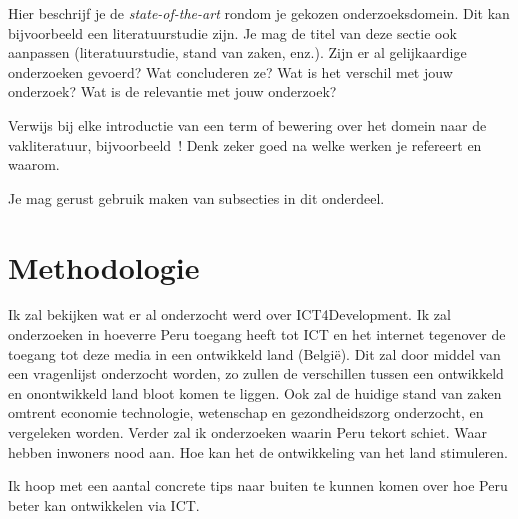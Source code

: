 
Hier beschrijf je de \emph{state-of-the-art} rondom je gekozen onderzoeksdomein. Dit kan bijvoorbeeld een literatuurstudie zijn. Je mag de titel van deze sectie ook aanpassen (literatuurstudie, stand van zaken, enz.). Zijn er al gelijkaardige onderzoeken gevoerd? Wat concluderen ze? Wat is het verschil met jouw onderzoek? Wat is de relevantie met jouw onderzoek?

Verwijs bij elke introductie van een term of bewering over het domein naar de vakliteratuur, bijvoorbeeld~\autocite{Doll1954}! Denk zeker goed na welke werken je refereert en waarom.


Je mag gerust gebruik maken van subsecties in dit onderdeel.

\section{Methodologie}
\label{sec:methodologie}
Ik zal bekijken wat er al onderzocht werd over ICT4Development. 
Ik zal onderzoeken in hoeverre Peru toegang heeft tot ICT en het internet tegenover de toegang tot deze media in een ontwikkeld land (Belgi\"e). Dit zal door middel van een vragenlijst onderzocht worden, zo zullen de verschillen tussen een ontwikkeld en onontwikkeld land bloot komen te liggen. Ook zal de huidige stand van zaken omtrent economie technologie, wetenschap en gezondheidszorg onderzocht, en vergeleken worden. Verder zal ik onderzoeken waarin Peru tekort schiet. Waar hebben inwoners nood aan. Hoe kan het de ontwikkeling van het land stimuleren.
 
 Ik hoop met een aantal concrete tips naar buiten te kunnen komen over hoe Peru beter kan ontwikkelen via ICT.
 

